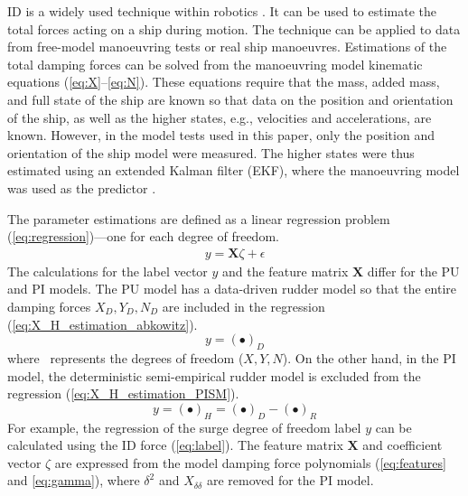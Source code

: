 ID is a widely used technique within robotics \citep{faber_inverse_2018, haningerNonparametricInverseDynamic2019, mastalliInverseDynamicsMPCNullspace2023, sunHighorderInverseDynamics2023, kurtzInverseDynamicsTrajectory2023}. It can be used to estimate the total forces acting on a ship during motion. The technique can be applied to data from free-model manoeuvring tests or real ship manoeuvres. 
Estimations of the total damping forces can be solved from the manoeuvring model kinematic equations  (\autoref{eq:X}--\autoref{eq:N}). These equations require that the mass, added mass, and full state of the ship are known so that data on the position and orientation of the ship, as well as the higher states, e.g., velocities and accelerations, are known.
However, in the model tests used in this paper, only the position and orientation of the ship model were measured.
The higher states were thus estimated using an extended Kalman filter (EKF), where the manoeuvring model was used as the predictor \citep{alexandersson_system_2022}.

The parameter estimations are defined as a linear regression problem (\autoref{eq:regression})---one for each degree of freedom. 
\begin{equation}\label{eq:regression}
\begin{split}y = \mathbf{X}\zeta + \epsilon\end{split}
\end{equation}
The calculations for the label vector \(y\) and the feature matrix \(\textbf{X}\) differ for the PU and PI models. The PU model has a data-driven rudder model so that the entire damping forces $X_D,Y_D,N_D$ are included in the regression (\autoref{eq:X_H_estimation_abkowitz}). 
\begin{equation}
    \label{eq:X_H_estimation_abkowitz}
    y = (\bullet)_D
\end{equation}
where \textbullet\ represents the degrees of freedom ($X,Y,N$).
On the other hand, in the PI model, the deterministic semi-empirical rudder model is excluded from the regression (\autoref{eq:X_H_estimation_PISM}). 
\begin{equation}
    \label{eq:X_H_estimation_PISM}
    y = (\bullet)_H = (\bullet)_D - (\bullet)_R
\end{equation}
For example, the regression of the surge degree of freedom label \(y\) can be calculated using the ID force (\autoref{eq:label}). 
The feature matrix \(\textbf{X}\) and coefficient vector $\zeta$ are expressed from the model damping force polynomials (\autoref{eq:features} and \autoref{eq:gamma}), where $\delta^2$ and $X_{\delta\delta}$ are removed for the PI model.

